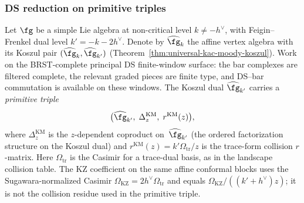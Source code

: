\subsubsection{DS reduction on primitive triples}

\begin{proposition}
\label{prop:ds-functor-primitive-triple}
Let $\fg$ be a simple Lie algebra at non-critical level
$k \neq -h^\vee$, with Feigin--Frenkel dual level
$k' = -k - 2h^\vee$. Denote by $\widehat{\fg}_k$ the
affine vertex algebra with its Koszul pair
$(\widehat{\fg}_k, \widehat{\fg}_{k'})$
\textup{(}Theorem~\textup{\ref{thm:universal-kac-moody-koszul}}\textup{)}.
Work on the BRST-complete principal DS finite-window surface:
the bar complexes are filtered complete, the relevant graded pieces
are finite type, and DS--bar commutation is available on these
windows.
The Koszul dual $\widehat{\fg}_{k'}$
carries a \emph{primitive triple}
\[
 \bigl(\widehat{\fg}_{k'}^{\phantom{!}},\;
 \Delta_z^{\mathrm{KM}},\;
 r^{\mathrm{KM}}(z)\bigr),
\]
where $\Delta_z^{\mathrm{KM}}$ is the $z$-dependent coproduct
on~$\widehat{\fg}_{k'}$
\textup{(}the ordered factorization structure on the Koszul dual\textup{)}
and $r^{\mathrm{KM}}(z)=k'\Omega_{\mathrm{tr}}/z$ is the trace-form
collision $r$-matrix. Here $\Omega_{\mathrm{tr}}$ is the Casimir for
a trace-dual basis, as in the landscape collision table. The KZ
coefficient on the same affine conformal
blocks uses the Sugawara-normalized Casimir
$\Omega_{\mathrm{KZ}}=2h^\vee\Omega_{\mathrm{tr}}$ and equals
$\Omega_{\mathrm{KZ}}/((k'+h^\vee)z)$; it is not the collision
residue used in the primitive triple.


\end{proposition}
